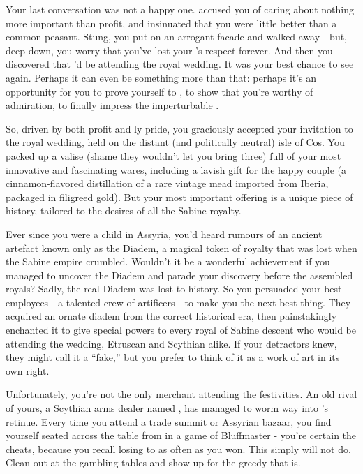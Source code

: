\documentclass[char]{Kos}
\begin{document}
Your last conversation was not a happy one. \cAnarchist{\They} accused you of caring about nothing more important than profit, and insinuated that you were little better than a common peasant. Stung, you put on an arrogant facade and walked away - but, deep down, you worry that you've lost your \cAnarchist{\sibling}'s respect forever. And then you discovered that \cAnarchist{\they}'d be attending the royal wedding. It was your best chance to see \cAnarchist{\them} again. Perhaps it can even be something more than that: perhaps it's an opportunity for you to prove yourself to \cAnarchist{\them}, to show \cAnarchist{\them} that you're worthy of \cAnarchist{\their} admiration, to finally impress the imperturbable \cAnarchist{}.

So, driven by both profit and \cMerchant{\sibling}ly pride, you graciously accepted your invitation to the royal wedding, held on the distant (and politically neutral) isle of Cos. You packed up a valise (shame they wouldn't let you bring three) full of your most innovative and fascinating wares, including a lavish gift for the happy couple (a cinnamon-flavored distillation of a rare vintage mead imported from Iberia, packaged in filigreed gold). But your most important offering is a unique piece of history, tailored to the desires of all the Sabine royalty. 

Ever since you were a child in Assyria, you'd heard rumours of an ancient artefact known only as the Diadem, a magical token of royalty that was lost when the Sabine empire crumbled. Wouldn't it be a wonderful achievement if you managed to uncover the Diadem and parade your discovery before the assembled royals? Sadly, the real Diadem was lost to history. So you persuaded your best employees - a talented crew of artificers - to make you the next best thing. They acquired an ornate diadem from the correct historical era, then painstakingly enchanted it to give special powers to every royal of Sabine descent who would be attending the wedding, Etruscan and Scythian alike. If your detractors knew, they might call it a ``fake,'' but you prefer to think of it as a work of art in its own right.

Unfortunately, you're not the only merchant attending the festivities. An old rival of yours, a Scythian arms dealer named \cArmsDealer{}, has managed to worm \cArmsDealer{\their} way into \cScythiaKing{\Monarch} \cScythiaKing{}'s retinue. Every time you attend a trade summit or Assyrian bazaar, you find yourself seated across the table from \cArmsDealer{\them} in a game of Bluffmaster - you're certain the \cArmsDealer{\human} cheats, because you recall losing to \cArmsDealer{\them} as often as you won. This simply will not do. Clean \cArmsDealer{} out at the gambling tables and show \cArmsDealer{\them} up for the greedy \cArmsDealer{\InsultOne} that \cArmsDealer{\they} is. 
\end{document}
